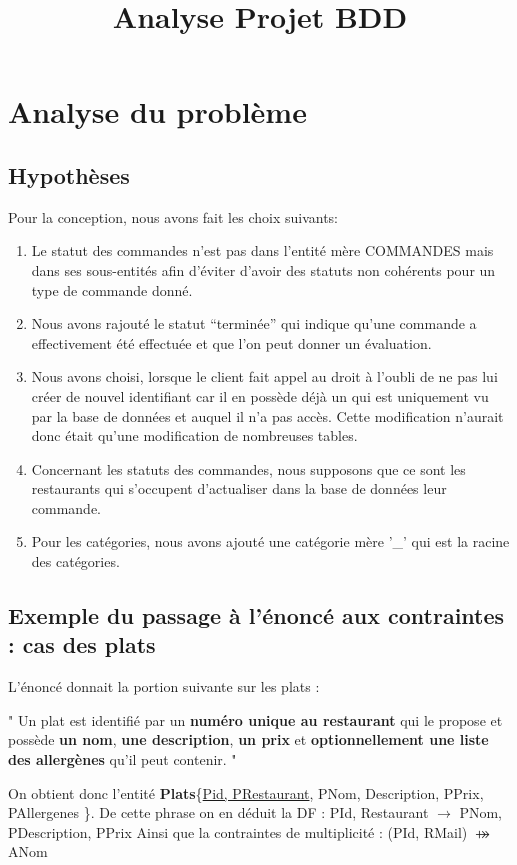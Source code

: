 \documentclass[10pt, a4paper]{article}
\title{Analyse Projet BDD}
\date{}
\begin{document}
\maketitle
\tableofcontents
\newpage

\section{Analyse du problème}
\subsection{Hypothèses}
Pour la conception, nous avons fait les choix suivants:
\begin{enumerate}
    \item Le statut des commandes n'est pas dans l'entité mère COMMANDES
          mais dans ses sous-entités afin d'éviter d'avoir des statuts non cohérents
          pour un type de commande donné.
    \item Nous avons rajouté le statut ``terminée'' qui indique qu'une
          commande a effectivement été effectuée et que l'on peut donner un
          évaluation.
    \item Nous avons choisi, lorsque le client fait appel au droit à l'oubli de ne pas lui créer de nouvel identifiant car il en possède déjà
          un qui est uniquement vu par la base de données et auquel il n'a pas accès. Cette modification n'aurait donc était qu'une modification de nombreuses tables.
    \item Concernant les statuts des commandes, nous supposons que ce sont les restaurants qui s'occupent d'actualiser dans la base de données leur commande.
    \item Pour les catégories, nous avons ajouté une catégorie mère '\_' qui est la racine des catégories.
\end{enumerate}

\subsection{Exemple du passage à l'énoncé aux contraintes : cas des plats}
L'énoncé donnait la portion suivante sur les plats :

"
Un plat est identifié par un \textbf{numéro unique au restaurant} qui le propose et possède \textbf{un nom}, \textbf{une description},
\textbf{un prix} et \textbf{optionnellement une liste des allergènes} qu’il peut contenir.
"

On obtient donc l'entité \textbf{Plats}\{\underline{Pid, PRestaurant}, PNom, Description, PPrix, PAllergenes \}.
De cette phrase on en déduit la DF : 
PId, Restaurant $\rightarrow$ PNom, PDescription, PPrix
Ainsi que la contraintes de multiplicité : (PId, RMail) $\psur$ ANom
\end{document}
